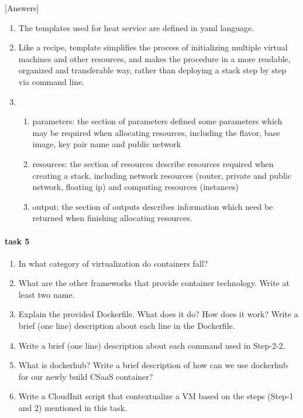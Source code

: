 \documentclass[a4paper,11pt]{article}
\begin{document}
[Answers]
\begin{enumerate}
    \item The templates used for heat service are defined in yaml language. 
    \item Like a recipe, template simplifies the process of initializing multiple virtual machines and other resources, and makes the procedure in a more readable, organized and transferable way, rather than deploying a stack step by step via command line. 
    \item \begin{enumerate}
        \item parameters: the section of parameters defined some parameters which may be required when allocating resources, including the flavor, base image, key pair name and public network
        \item resources: the section of resources describe resources required when creating a stack, including network resources (router, private and public network, floating ip) and computing resources (instances)
        \item output: the section of outputs describes information which need be returned when finishing allocating resources. 
    \end{enumerate}
\end{enumerate}


\paragraph{task 5}
\begin{enumerate}
    \item In what category of virtualization do containers fall?
    \item What are the other frameworks that provide container technology. Write at least two name.
    \item Explain the provided Dockerfile. What does it do? How does it work? Write a brief (one line) description about each line in the Dockerfile.
    \item Write a brief (one line) description about each command used in Step-2-2.
    \item What is dockerhub? Write a brief description of how can we use dockerhub for our newly build CSaaS container?
    \item Write a CloudInit script that contextualize a VM based on the steps (Step-1 and 2) mentioned in this task.
\end{enumerate}
\end{document}
